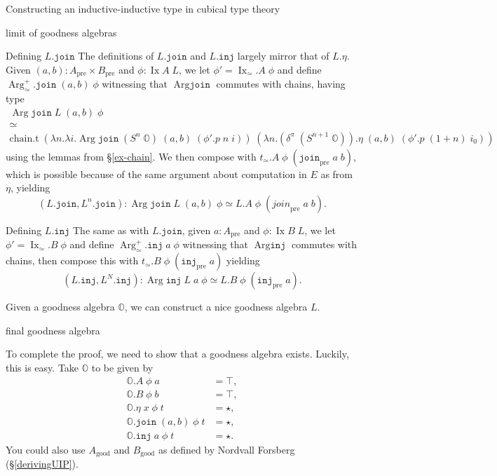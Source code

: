 \documentclass[acmsmall,review]{acmart}\settopmatter{printfolios=true,printccs=false,printacmref=false}
\DeclareMathOperator{\Arg}{Arg}
\DeclareMathOperator{\Ix}{Ix}
\newcommand{\pre}[1]{{#1}_\text{pre}}
\newcommand{\good}[1]{{#1}_\text{good}}
\newcommand{\bbO}{\mathbb{O}}
\newcommand{\join}{\texttt{join}}
\newcommand{\inj}{\texttt{inj}}
\def\Forsberg/{Nordvall Forsberg}
\begin{document}
\begin{section}{Constructing an inductive-inductive type in cubical type theory}
\begin{subsection}{limit of goodness algebras}
\begin{subsubsection}{Defining $L.\join$}
The definitions of $L.\join$ and $L.\inj$ largely mirror that of $L.\eta$.
Given $(a, b) : \pre{A} \times \pre{B}$ and $\phi : \Ix A\;L$, we let $\phi' = \Ix_\simeq.A\;\phi$ and define $\Arg_\simeq^+.\join\;(a,b)\;\phi$ witnessing that $\Arg\join$ commutes with chains, having type
\begin{gather*}
\Arg\join\;L\;(a,b)\;\phi\\
\simeq\\
\text{chain.t}\;(\lambda n.\lambda i.\Arg\join\;(S^n\;\bbO)\;(a,b)\;(\phi'.p\;n\;i))\;(\lambda n.(\delta^\pi\;(S^{n+1}\;\bbO)).\eta\;(a,b)\;(\phi'.p\;(1+n)\;i_0))
\end{gather*}
using the lemmas from \S\ref{ex-chain}. We then compose with $t_\simeq.A\;\phi\;(\pre{\join}\;a\;b)$, which is possible because of the same argument about computation in $E$ as from $\eta$, yielding \[(L.\join, L^n.\join) : \Arg\join\;L\;(a,b)\;\phi \simeq L.A\;\phi\;(\pre{join}\;a\;b).\]
\end{subsubsection}

\begin{subsubsection}{Defining $L.\inj$}
The same as with $L.\join$, given $a : \pre{A}$ and $\phi : \Ix B\;L$, we let $\phi' = \Ix_\simeq.B\;\phi$ and define $\Arg_\simeq^+.\inj\;a\;\phi$ witnessing that $\Arg\inj$ commutes with chains, then compose this with $t_\simeq.B\;\phi\;(\pre{\inj}\;a)$ yielding \[(L.\inj, L^N.\inj) : \Arg\inj\;L\;a\;\phi \simeq L.B\;\phi\;(\pre{\inj}\;a).\]
\end{subsubsection}

\begin{lemma}\label{example-a-goodness-to-nice-goodness}
    Given a goodness algebra $\bbO$, we can construct a nice goodness algebra $L$.
\end{lemma}

\end{subsection}

\begin{subsection}{final goodness algebra}\label{ex-final-alg}

To complete the proof, we need to show that a goodness algebra exists. Luckily, this is easy. Take $\bbO$ to be given by \begin{align*}
\bbO.A\;\phi\;a &= \top,\\
\bbO.B\;\phi\;b &= \top,\\
\bbO.\eta\;x\;\phi\;t &= \star,\\
\bbO.\join\;(a, b)\;\phi\;t &= \star,\\
\bbO.\inj\;a\;\phi\;t &= \star.
\end{align*}
You could also use $\good{A}$ and $\good{B}$ as defined by \Forsberg/ (\S\ref{derivingUIP}).


\end{subsection}
\end{section}
\end{document}
